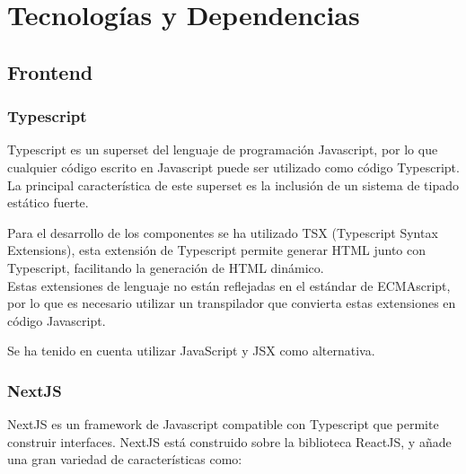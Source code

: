 
\vspace{-0.35cm}



\hypertarget{tecnologuxedas-y-dependencias}{%
\section{Tecnologías y
Dependencias}\label{tecnologuxedas-y-dependencias}}

\hypertarget{frontend}{%
\subsection{Frontend}\label{frontend}}

\hypertarget{typescript}{%
\subsubsection{\texorpdfstring{Typescript
}{Typescript }}\label{typescript}}

Typescript es un superset del lenguaje de programación Javascript, por
lo que cualquier código escrito en Javascript puede ser utilizado como
código Typescript. La principal característica de este superset es la
inclusión de un sistema de tipado estático fuerte.

Para el desarrollo de los componentes se ha utilizado TSX (Typescript
Syntax Extensions), esta extensión de Typescript permite generar HTML
junto con Typescript, facilitando la generación de HTML dinámico.\\
Estas extensiones de lenguaje no están reflejadas en el estándar de
ECMAscript, por lo que es necesario utilizar un transpilador que
convierta estas extensiones en código Javascript.

Se ha tenido en cuenta utilizar JavaScript y JSX como alternativa.

\hypertarget{nextjs}{%
\subsubsection{NextJS}\label{nextjs}}

NextJS es un framework de Javascript compatible con Typescript que
permite construir interfaces. NextJS está construido sobre la biblioteca
ReactJS, y añade una gran variedad de características como:

